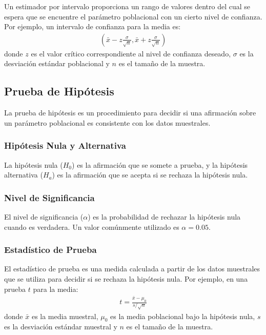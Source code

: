 Un estimador por intervalo proporciona un rango de valores dentro del cual se espera que se encuentre el par\'ametro poblacional con un cierto nivel de confianza. Por ejemplo, un intervalo de confianza para la media es:
\begin{eqnarray*}
\left( \bar{x} - z \frac{\sigma}{\sqrt{n}}, \bar{x} + z \frac{\sigma}{\sqrt{n}} \right)
\end{eqnarray*}
donde $z$ es el valor cr\'itico correspondiente al nivel de confianza deseado, $\sigma$ es la desviaci\'on est\'andar poblacional y $n$ es el tama\~no de la muestra.

\subsection{Prueba de Hip\'otesis}

La prueba de hip\'otesis es un procedimiento para decidir si una afirmaci\'on sobre un par\'ametro poblacional es consistente con los datos muestrales.

\subsubsection{Hip\'otesis Nula y Alternativa}

La hip\'otesis nula ($H_0$) es la afirmaci\'on que se somete a prueba, y la hip\'otesis alternativa ($H_a$) es la afirmaci\'on que se acepta si se rechaza la hip\'otesis nula.

\subsubsection{Nivel de Significancia}

El nivel de significancia ($\alpha$) es la probabilidad de rechazar la hip\'otesis nula cuando es verdadera. Un valor com\'unmente utilizado es $\alpha = 0.05$.

\subsubsection{Estad\'istico de Prueba}

El estad\'istico de prueba es una medida calculada a partir de los datos muestrales que se utiliza para decidir si se rechaza la hip\'otesis nula. Por ejemplo, en una prueba $t$ para la media:
\begin{eqnarray*}
t = \frac{\bar{x} - \mu_0}{s / \sqrt{n}}
\end{eqnarray*}
donde $\bar{x}$ es la media muestral, $\mu_0$ es la media poblacional bajo la hip\'otesis nula, $s$ es la desviaci\'on est\'andar muestral y $n$ es el tama\~no de la muestra.

